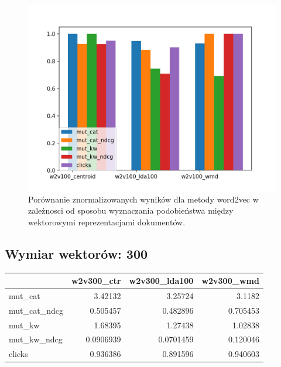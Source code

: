 \documentclass[pl]{minipw} %
\begin{document}
\begin{figure}[H]
	\centering
	\includegraphics[width=1\textwidth]{img/results/w2v100_centroid_w2v100_lda100_w2v100_wmd_.png}
	\caption{Porównanie znormalizowanych wyników dla metody word2vec w zależnosci od sposobu wyznaczania podobieństwa między wektorowymi reprezentacjami dokumentów.}
\end{figure}

\subsection{Wymiar wektorów: 300}

\begin{center}
	\begin{tabular}{lrrr}
		\hline
		&   w2v300\_ctr &   w2v300\_lda100 &   w2v300\_wmd \\
		\hline
		mut\_cat      &    3.42132   &       3.25724   &     3.1182   \\
		mut\_cat\_ndcg &    0.505457  &       0.482896  &     0.705453 \\
		mut\_kw       &    1.68395   &       1.27438   &     1.02838  \\
		mut\_kw\_ndcg  &    0.0906939 &       0.0701459 &     0.120046 \\
		clicks       &    0.936386  &       0.891596  &     0.940603 \\
		\hline
	\end{tabular}
\end{center}
\end{document}
